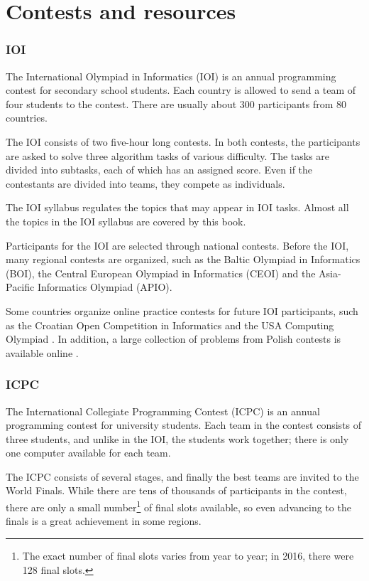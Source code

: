 \section{Contests and resources}

\subsubsection{IOI}

The International Olympiad in Informatics (IOI)
is an annual programming contest for
secondary school students.
Each country is allowed to send a team of
four students to the contest.
There are usually about 300 participants
from 80 countries.

The IOI consists of two five-hour long contests.
In both contests, the participants are asked to
solve three algorithm tasks of various difficulty.
The tasks are divided into subtasks,
each of which has an assigned score.
Even if the contestants are divided into teams,
they compete as individuals.

The IOI syllabus \cite{iois} regulates the topics
that may appear in IOI tasks.
Almost all the topics in the IOI syllabus
are covered by this book.

Participants for the IOI are selected through
national contests.
Before the IOI, many regional contests are organized,
such as the Baltic Olympiad in Informatics (BOI),
the Central European Olympiad in Informatics (CEOI)
and the Asia-Pacific Informatics Olympiad (APIO).

Some countries organize online practice contests
for future IOI participants,
such as the Croatian Open Competition in Informatics \cite{coci}
and the USA Computing Olympiad \cite{usaco}.
In addition, a large collection of problems from Polish contests
is available online \cite{main}.

\subsubsection{ICPC}

The International Collegiate Programming Contest (ICPC)
is an annual programming contest for university students.
Each team in the contest consists of three students,
and unlike in the IOI, the students work together;
there is only one computer available for each team.

The ICPC consists of several stages, and finally the
best teams are invited to the World Finals.
While there are tens of thousands of participants
in the contest, there are only a small number\footnote{The exact number of final
slots varies from year to year; in 2016, there were 128 final slots.} of final slots available,
so even advancing to the finals
is a great achievement in some regions.

